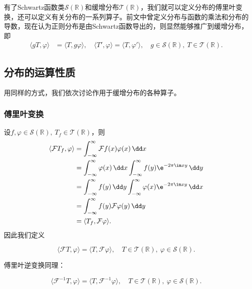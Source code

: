 有了Schwartz函数类$\mathcal{S}(\mathbb{R})$和缓增分布$\mathcal{T}(\mathbb{R})$，我们就可以定义分布的傅里叶变换，还可以定义有关分布的一系列算子。前文中曾定义分布与函数的乘法和分布的导数，现在认为正则分布是由Schwartz函数导出的，则显然能够推广到缓增分布，即
\begin{align}
    \langle gT,\varphi\rangle&=\langle T,g\varphi\rangle,\quad \langle T',\varphi\rangle=\langle T,\varphi'\rangle,\quad g\in\mathcal{S}(\mathbb{R}),\ T\in\mathcal{T}(\mathbb{R}).
\end{align}

\subsection{分布的运算性质}\label{sub:operation_of_distribution}
用同样的方式，我们依次讨论作用于缓增分布的各种算子。

\subsubsection{傅里叶变换}

设$f,\varphi\in\mathcal{S}(\mathbb{R}),\ T_f\in\mathcal{T}(\mathbb{R})$，则
\begin{align}
    \langle\mathcal{F}T_f,\varphi\rangle&=\int_{-\infty}^{\infty}\mathcal{F}f(x)\varphi(x)\,\dd x\nonumber\\
    &=\int_{-\infty}^{\infty}\varphi(x)\,\dd x\int_{-\infty}^{\infty}f(y)\e^{-2\pi\im xy}\,\dd y\nonumber\\
    &=\int_{-\infty}^{\infty}f(y)\,\dd y\int_{-\infty}^{\infty}\varphi(x)\e^{-2\pi \im xy}\,\dd x\nonumber\\
    &=\int_{-\infty}^{\infty}f(y)\mathcal{F}\varphi(y)\,\dd y\nonumber\\
    &=\langle T_f,\mathcal{F}\varphi\rangle.
\end{align}
因此我们定义
\begin{definition}[分布的傅里叶变换]
    \begin{equation}
        \langle \mathcal{F}T,\varphi\rangle =\langle T,\mathcal{F}\varphi\rangle,\quad T\in\mathcal{T}(\mathbb{R}),\ \varphi\in\mathcal{S}(\mathbb{R}).
    \end{equation}
\end{definition}

傅里叶逆变换同理：
\begin{definition}[分布的傅里叶反变换]
    \begin{equation}
        \langle \mathcal{F}^{-1}T,\varphi\rangle =\langle T,\mathcal{F}^{-1}\varphi\rangle,\quad T\in\mathcal{T}(\mathbb{R}),\ \varphi\in\mathcal{S}(\mathbb{R}).
    \end{equation}
\end{definition}


